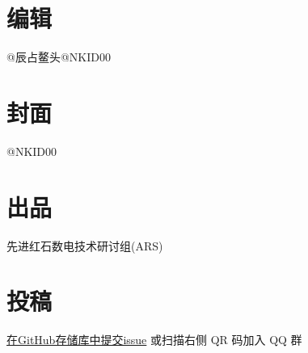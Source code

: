 \documentclass[UTF8,12pt,punct=kaiming,fontset=none]{ctexart}
\begin{document}
\vspace{2cm}
\hspace{0.3cm}
\begin{minipage}[c]{0.55\linewidth}
    \titleformat{\section}[leftmargin]{\sffamily\bfseries}{}{0cm}{}
    \titlespacing{\section}{1.2cm}{1ex}{0cm}

    \section*{编辑}
    @辰占鳌头\hspace{0.5cm}@NKID00

    \section*{封面}
    @NKID00

    \section*{出品}
    先进红石数电技术研讨组(ARS)

    \section*{投稿}
    \href{https://github.com/ARS-MC/RRDC/issues/new?assignees=&labels=%E6%8A%95%E7%A8%BF&template=contribute.md&title=%E5%9C%A8%E6%AD%A4%E5%A4%84%E5%A1%AB%E5%86%99%E6%A0%87%E9%A2%98}{在GitHub存储库中提交issue} 或扫描右侧 QR 码加入 QQ 群
\end{minipage}

\end{document}
